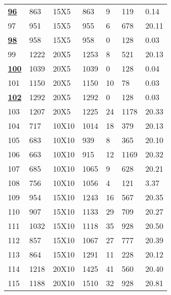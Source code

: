 \documentclass[14pt]{acmsiggraph}
\begin{document}
\begin{table}[h!]
\begin{center}
{\begin{tabular}{||lllllll}
					\underline{\textbf{96}}  & 863  & 15X5   & \cellcolor[rgb]{0.43,0.67,0.27}863  & 9   & 119  & 0.14  \\
					97  & 951  & 15X5   & \cellcolor[rgb]{0.44,0.67,0.27}955  & 6   & 678  & 20.11 \\
					\underline{\textbf{98}}  & 958  & 15X5   & \cellcolor[rgb]{0.43,0.67,0.27}958  & 0   & 128  & 0.03  \\
					99  & 1222 & 20X5   & \cellcolor[rgb]{0.46,0.69,0.29}1253 & 8   & 521  & 20.13 \\
					\underline{\textbf{100}} & 1039 & 20X5   & \cellcolor[rgb]{0.43,0.67,0.27}1039 & 0   & 128  & 0.04  \\
					101 & 1150 & 20X5   & \cellcolor[rgb]{0.43,0.67,0.27}1150 & 10  & 78   & 0.03  \\
					\underline{\textbf{102}} & 1292 & 20X5   & \cellcolor[rgb]{0.43,0.67,0.27}1292 & 0   & 128  & 0.03  \\
					103 & 1207 & 20X5   & \cellcolor[rgb]{0.45,0.68,0.28}1225 & 24  & 1178 & 20.33 \\
					104 & 717  & 10X10  & \cellcolor[rgb]{0.9,0.87,0.47}1014  & 18  & 379  & 20.13 \\
					105 & 683  & 10X10  & \cellcolor[rgb]{0.85,0.85,0.45}939  & 8   & 365  & 20.10 \\
					106 & 663  & 10X10  & \cellcolor[rgb]{0.86,0.86,0.45}915  & 12  & 1169 & 20.32 \\
					107 & 685  & 10X10  & \cellcolor[rgb]{1,0.82,0.46}1065    & 9   & 628  & 20.21 \\
					108 & 756  & 10X10  & \cellcolor[rgb]{0.88,0.87,0.46}1056 & 4   & 121  & 3.37  \\
					109 & 954  & 15X10  & \cellcolor[rgb]{0.77,0.82,0.41}1243 & 16  & 567  & 20.35 \\
					110 & 907  & 15X10  & \cellcolor[rgb]{0.71,0.79,0.39}1133 & 29  & 709  & 20.27 \\
					111 & 1032 & 15X10  & \cellcolor[rgb]{0.52,0.71,0.31}1118 & 35  & 928  & 20.50 \\
					112 & 857  & 15X10  & \cellcolor[rgb]{0.71,0.79,0.39}1067 & 27  & 777  & 20.39 \\
					113 & 864  & 15X10  & \cellcolor[rgb]{0.99,0.91,0.51}1291 & 11  & 228  & 20.12 \\
					114 & 1218 & 20X10  & \cellcolor[rgb]{0.62,0.76,0.35}1425 & 41  & 560  & 20.40 \\
					115 & 1188 & 20X10  & \cellcolor[rgb]{0.74,0.8,0.4}1510   & 32  & 928  & 20.81 \\

\end{tabular}}
\end{center}
\end{table}
\end{document}
